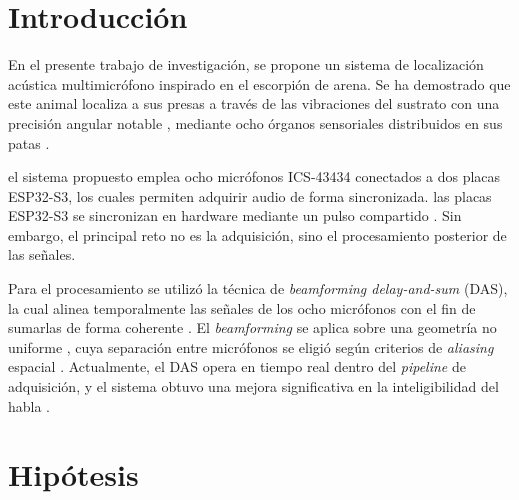 \documentclass[12pt]{article}
\begin{document}
\section{Introducción}

En el presente trabajo de investigación, se propone un sistema de localización acústica multimicrófono inspirado en el escorpión de arena. Se ha demostrado  que este animal localiza a sus presas a través de las vibraciones del sustrato con una precisión angular notable , mediante ocho órganos sensoriales distribuidos en sus patas .

 el sistema propuesto emplea ocho micrófonos ICS-43434 conectados a dos placas ESP32-S3, los cuales permiten adquirir audio de forma sincronizada.  las placas ESP32-S3 se sincronizan en hardware mediante un pulso compartido . Sin embargo, el principal reto no es la adquisición, sino el procesamiento posterior de las señales.

Para el procesamiento se utilizó la técnica de \textit{beamforming delay-and-sum} (DAS), la cual alinea temporalmente las señales de los ocho micrófonos con el fin de  sumarlas de forma coherente . El \textit{beamforming} se aplica sobre una geometría no uniforme , cuya separación entre micrófonos se eligió según criterios de \textit{aliasing} espacial . Actualmente, el DAS opera en tiempo real dentro del \textit{pipeline} de adquisición, y el sistema obtuvo una mejora significativa en la inteligibilidad del habla .

\section{Hipótesis}
\end{document}
